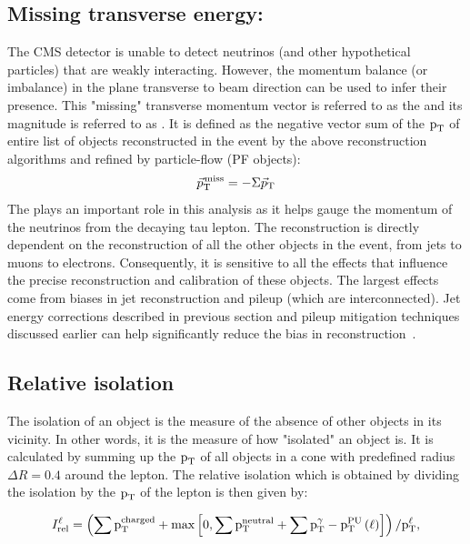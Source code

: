 \subsection{Missing transverse energy: \ptvecmiss} 
\label{mt_met_recon}
The CMS detector is unable to detect neutrinos (and other hypothetical particles) that are weakly interacting. However, the momentum balance (or imbalance) in the plane transverse to beam direction can be used to infer their presence. This "missing" transverse momentum vector is referred to as the \ptvecmiss and its magnitude is referred to as \ptmiss. It is defined as the negative vector sum of the $\text{p}_\text{T}$ of entire list of objects reconstructed in the event by the above reconstruction algorithms and refined by particle-flow (PF objects):
\begin{equation}
  {\vec p}_{\mathrm{T}}^{\kern1pt\text{miss}}=-\Sigma{\vec p}_{\mathrm{T}}
\end{equation}
The \ptvecmiss plays an important role in this analysis as it helps gauge the momentum of the neutrinos from the decaying tau lepton. The \ptvecmiss reconstruction is directly dependent on the reconstruction of all the other objects in the event, from jets to muons to electrons. Consequently, it is sensitive to all the effects that influence the precise reconstruction and calibration of these objects. The largest effects come from biases in jet reconstruction and pileup (which are interconnected). Jet energy corrections described in previous section and pileup mitigation techniques discussed earlier can help significantly reduce the bias in \ptvecmiss reconstruction~\cite{Sirunyan:2019kia}. 


\subsection{Relative isolation}
\label{isolation}
The isolation of an object is the measure of the absence of other objects in its vicinity. In other words, it is the measure of how "isolated" an object is. It is calculated by summing up the $\text{p}_\text{T}$ of all objects in a cone with predefined radius $\Delta R=0.4$ around the lepton. The relative isolation which is obtained by dividing the isolation by the $\text{p}_\text{T}$ of the lepton is then given by:

\begin{equation}
I_\text{rel}^{\ell} = \left( \sum  \text{p}_\text{T}^\text{charged} + \text{max}\left[ 0, \sum \text{p}_\text{T}^\text{neutral}
                                 +  \sum \text{p}_\text{T}^{\gamma} - \text{p}_\text{T}^\text{PU}\left(\ell\right)  \right] \right) /  \text{p}_\text{T}^{\ell},
\end{equation}

